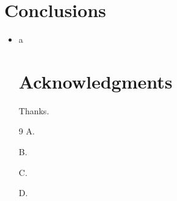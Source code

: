 \documentclass{article}
\begin{document}
\section{Conclusions}
\begin{itemize}\item a
\section*{Acknowledgments}
Thanks.
\begin{thebibliography}{9}
 A.

 B.

 C.

 D.
\end{thebibliography}
\end{itemize}
\end{document}

